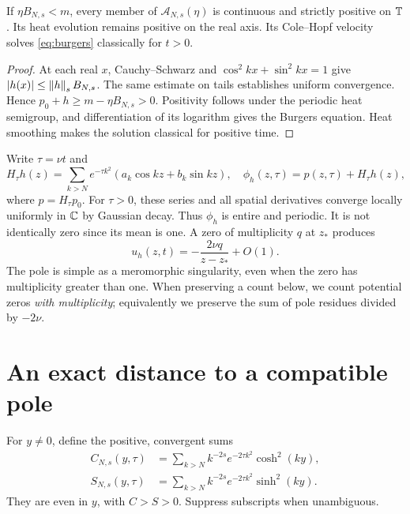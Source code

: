 \documentclass[11pt]{article}
\begin{document}
\begin{lemma}\label{lem:positivity}
If $\eta B_{N,s}<m$, every member of $\mathcal A_{N,s}(\eta)$ is continuous and strictly positive on $\mathbb T$. Its heat evolution remains positive on the real axis. Its Cole--Hopf velocity solves \eqref{eq:burgers} classically for $t>0$.
\end{lemma}
\begin{proof}
At each real $x$, Cauchy--Schwarz and $\cos^2kx+\sin^2kx=1$ give $|h(x)|\le\left\lVert h\right\rVert_s B_{N,s}$. The same estimate on tails establishes uniform convergence. Hence $p_0+h\ge m-\eta B_{N,s}>0$. Positivity follows under the periodic heat semigroup, and differentiation of its logarithm gives the Burgers equation. Heat smoothing makes the solution classical for positive time.
\end{proof}

Write $\tau=\nu t$ and
\begin{equation}\label{eq:heat}
 H_\tau h(z)=\sum_{k>N}e^{-\tau k^2}(a_k\cos kz+b_k\sin kz),\quad
 \phi_h(z,\tau)=p(z,\tau)+H_\tau h(z),
\end{equation}
where $p=H_\tau p_0$. For $\tau>0$, these series and all spatial derivatives converge locally uniformly in $\mathbb C$ by Gaussian decay. Thus $\phi_h$ is entire and periodic. It is not identically zero since its mean is one. A zero of multiplicity $q$ at $z_*$ produces
\begin{equation}\label{eq:residue}
 u_h(z,t)=-\frac{2\nu q}{z-z_*}+O(1).
\end{equation}
The pole is simple as a meromorphic singularity, even when the zero has multiplicity greater than one. When preserving a count below, we count potential zeros \emph{with multiplicity}; equivalently we preserve the sum of pole residues divided by $-2\nu$.

\section{An exact distance to a compatible pole}
For $y\ne0$, define the positive, convergent sums
\begin{align}
 C_{N,s}(y,\tau)&=\sum_{k>N}k^{-2s}e^{-2\tau k^2}\cosh^2(ky),\label{eq:C}\\
 S_{N,s}(y,\tau)&=\sum_{k>N}k^{-2s}e^{-2\tau k^2}\sinh^2(ky).\label{eq:S}
\end{align}
They are even in $y$, with $C>S>0$. Suppress subscripts when unambiguous.
\end{document}
